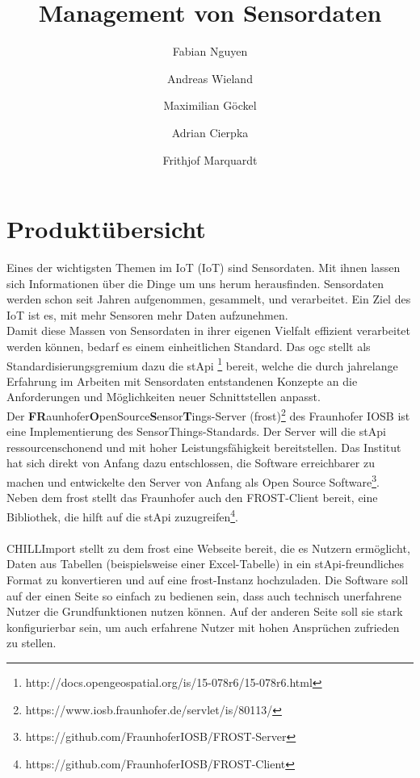 \documentclass[a4paper, 12 pt]{article}
\author{Fabian Nguyen \and Andreas Wieland \and Maximilian Göckel \and Adrian Cierpka \and Frithjof Marquardt}
\title{Management von Sensordaten}
\begin{document}
\maketitle
\newpage
\tableofcontents
\newpage

	\section{Produktübersicht}

	Eines der wichtigsten Themen im \gls{IoT} (IoT) sind Sensordaten. Mit ihnen lassen sich Informationen über die Dinge um uns herum herausfinden. Sensordaten werden schon seit Jahren aufgenommen, gesammelt, und verarbeitet. Ein Ziel des IoT ist es, mit mehr Sensoren mehr Daten aufzunehmen. \\

	Damit diese Massen von Sensordaten in ihrer eigenen Vielfalt effizient verarbeitet werden können, bedarf es einem einheitlichen Standard. Das \gls{ogc} stellt als Standardisierungsgremium dazu die \gls{stApi} \footnote{http://docs.opengeospatial.org/is/15-078r6/15-078r6.html} bereit, welche die durch jahrelange Erfahrung im Arbeiten mit Sensordaten entstandenen Konzepte an die Anforderungen und Möglichkeiten neuer Schnittstellen anpasst. \\

	Der \textbf{FR}aunhofer\textbf{O}penSource\textbf{S}ensor\textbf{T}ings-Server (\gls{frost})\footnote{https://www.iosb.fraunhofer.de/servlet/is/80113/} des Fraunhofer IOSB ist eine Implementierung des SensorThings-Standards. Der Server will die \gls{stApi} ressourcenschonend und mit hoher Leistungsfähigkeit bereitstellen. Das Institut hat sich direkt von Anfang dazu entschlossen, die Software erreichbarer zu machen und entwickelte den Server von Anfang als Open Source Software\footnote{https://github.com/FraunhoferIOSB/FROST-Server}. \\

	Neben dem \gls{frost} stellt das Fraunhofer auch den FROST-Client bereit, eine Bibliothek, die hilft auf die \gls{stApi} zuzugreifen\footnote{https://github.com/FraunhoferIOSB/FROST-Client}. \\
	\ \\
	CHILLImport stellt zu dem \gls{frost} eine Webseite bereit, die es Nutzern ermöglicht, Daten aus Tabellen (beispielsweise einer Excel-Tabelle) in ein \gls{stApi}-freundliches Format zu konvertieren und auf eine \gls{frost}-Instanz hochzuladen. Die Software soll auf der einen Seite so einfach zu bedienen sein, dass auch technisch unerfahrene Nutzer die Grundfunktionen nutzen können. Auf der anderen Seite soll sie stark konfigurierbar sein, um auch erfahrene Nutzer mit hohen Ansprüchen zufrieden zu stellen.\\
\end{document}
